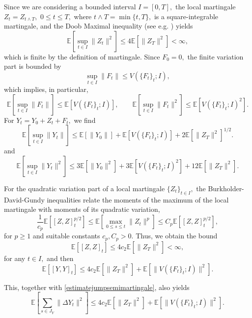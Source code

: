 \documentclass[reqno,12pt]{amsart}
\theoremstyle{plain} %
\theoremstyle{definition} %
\begin{document}
Since we are considering a bounded interval $I=[0, T],$ the local martingale $Z_t = Z_{t \land T},$ $0\leq t \leq T,$ where $t \land T = \min\{t, T\},$ is a square-integrable martingale, and the Doob Maximal inequality (see e.g. \cite[Theorem I.20]{Protter2005}) yields
\begin{equation}
    \label{expectationZtsquaredfinite}
    \mathbb{E}\left[\sup_{t\in I} \|Z_t\|^2\right] \leq 4\mathbb{E}[\|Z_T\|^2] < \infty,
\end{equation}
which is finite by the definition of martingale. Since $F_0 = 0,$ the finite variation part is bounded by
\[
    \sup_{t\in I} \|F_t\| \leq V(\{F_t\}_t; I),
\]
which implies, in particular,
\[
    \mathbb{E}\left[\sup_{t\in I} \|F_t\|\right] \leq \mathbb{E}\left[V(\{F_t\}_t; I)\right], \qquad \mathbb{E}\left[\sup_{t\in I} \|F_t\|^2\right] \leq \mathbb{E}\left[V(\{F_t\}_t; I)^2\right].
\]
For $Y_t = Y_0 + Z_t + F_t,$ we find
\begin{equation}
    \label{expectationYtfinite}
    \mathbb{E}\left[\sup_{t\in I} \|Y_t\|\right] \leq \mathbb{E}[\|Y_0\|] + \mathbb{E}\left[V(\{F_t\}_t; I)\right] + 2\mathbb{E}\left[\|Z_T\|^2\right]^{1/2}.
\end{equation}
and
\begin{equation}
    \label{expectationYtsquaredfinite}
    \mathbb{E}\left[\sup_{t\in I} \|Y_t\|^2\right] \leq 3\mathbb{E}[\|Y_0\|^2] + 3\mathbb{E}\left[V(\{F_t\}_t; I)^2\right] + 12\mathbb{E}[\|Z_T\|^2].
\end{equation}

For the quadratic variation part of a local martingale $\{Z_t\}_{t\in I},$ the Burkholder-David-Gundy inequalities \cite[Theorem IV.48]{Protter2005} relate the moments of the maximum of the local martingale with moments of its quadratic variation,
\[
    \frac{1}{c_p}\mathbb{E}\left[[Z, Z]_t^{p/2}\right] \leq \mathbb{E}\left[\max_{0\leq s \leq t} \|Z_t\|^p\right] \leq C_p\mathbb{E}\left[[Z, Z]_t^{p/2}\right],
\]
for $p \geq 1$ and suitable constants $c_p, C_p > 0.$ Thus, we obtain the bound
\[
    \mathbb{E}\left[[Z, Z]_t\right] \leq 4c_2\mathbb{E}\left[\|Z_T\|^2\right] < \infty,
\]
for any $t\in I,$ and then
\begin{equation}
    \label{expectationofquadraticvariation}
    \mathbb{E}\left[[Y, Y]_t\right] \leq 4c_2\mathbb{E}\left[\|Z_T\|^2\right] + \mathbb{E}\left[\|V(\{F_t\}_t; I)\|^2\right].
\end{equation}

This, together with \cref{estimatejumpsemimartingale}, also yields
\begin{equation}
    \label{expectationsquaredjumps}
    \mathbb{E}\left[\sum_{s\in J_{Y}} \|\Delta Y_t\|^2 \right] \leq 4c_2\mathbb{E}\left[\|Z_T\|^2\right] + \mathbb{E}\left[\|V(\{F_t\}_t; I)\|^2\right].
\end{equation}
\end{document}
